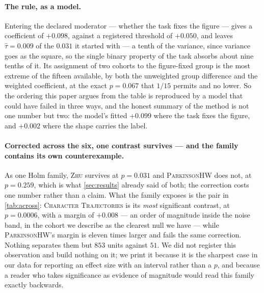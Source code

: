 \documentclass[10pt,a4paper]{article}
\begin{document}
\paragraph{The rule, as a model.} Entering the declared moderator --- whether the task fixes the
figure --- gives a coefficient of $+0.098$, against a registered threshold of $+0.050$, and leaves
$\hat\tau = 0.009$ of the $0.031$ it started with --- a tenth of the variance, since variance goes as
the square, so the single binary property of the task absorbs about nine tenths of it.
Its assignment of two cohorts to the figure-fixed
group is the most extreme of the fifteen available, by both the unweighted group difference and the
weighted coefficient, at the exact $p = 0.067$ that $1/15$ permits and no lower. So the ordering
this paper argues from the table is reproduced by a model that could have failed in three ways, and
the honest summary of the method is not one number but two: the model's fitted $+0.099$ where
the task fixes the figure, and $+0.002$ where the shape carries the label.

\paragraph{Corrected across the six, one contrast survives --- and the family contains its own
counterexample.} As one Holm family, \textsc{Zhu} survives at $p = 0.031$ and
\textsc{ParkinsonHW} does not, at $p = 0.259$, which is what \cref{sec:results} already said of
both; the correction costs one number rather than a claim. What the family exposes is the pair in
\cref{tab:across}: \textsc{Character Trajectories} is its \emph{most} significant contrast, at
$p = 0.0006$, with a margin of $+0.008$ --- an order of magnitude inside the noise band, in the
cohort we describe as the clearest null we have --- while \textsc{ParkinsonHW}'s margin is eleven
times larger and fails the same correction. Nothing separates them but $853$ units against $51$.
We did not register this observation and build nothing on it; we print it because it is the sharpest
case in our data for reporting an effect size with an interval rather than a $p$, and because a
reader who takes significance as evidence of magnitude would read this family exactly backwards.
\end{document}
